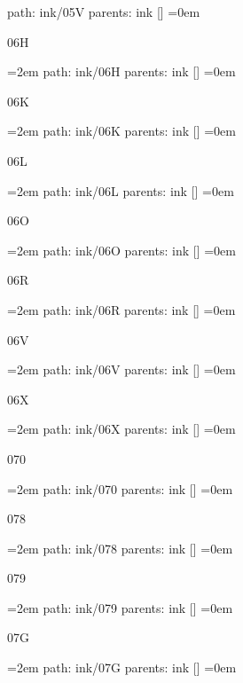 path: ink/05V
\smallskip
parents:  ink []
\smallskip
\leftskip=0em
\par\endgroup
\bigskip
{}
06H
\smallskip
\par\begingroup
\leftskip=2em
path: ink/06H
\smallskip
parents:  ink []
\smallskip
\leftskip=0em
\par\endgroup
\bigskip
{}
06K
\smallskip
\par\begingroup
\leftskip=2em
path: ink/06K
\smallskip
parents:  ink []
\smallskip
\leftskip=0em
\par\endgroup
\bigskip
{}
06L
\smallskip
\par\begingroup
\leftskip=2em
path: ink/06L
\smallskip
parents:  ink []
\smallskip
\leftskip=0em
\par\endgroup
\bigskip
{}
06O
\smallskip
\par\begingroup
\leftskip=2em
path: ink/06O
\smallskip
parents:  ink []
\smallskip
\leftskip=0em
\par\endgroup
\bigskip
{}
06R
\smallskip
\par\begingroup
\leftskip=2em
path: ink/06R
\smallskip
parents:  ink []
\smallskip
\leftskip=0em
\par\endgroup
\bigskip
{}
06V
\smallskip
\par\begingroup
\leftskip=2em
path: ink/06V
\smallskip
parents:  ink []
\smallskip
\leftskip=0em
\par\endgroup
\bigskip
{}
06X
\smallskip
\par\begingroup
\leftskip=2em
path: ink/06X
\smallskip
parents:  ink []
\smallskip
\leftskip=0em
\par\endgroup
\bigskip
{}
070
\smallskip
\par\begingroup
\leftskip=2em
path: ink/070
\smallskip
parents:  ink []
\smallskip
\leftskip=0em
\par\endgroup
\bigskip
{}
078
\smallskip
\par\begingroup
\leftskip=2em
path: ink/078
\smallskip
parents:  ink []
\smallskip
\leftskip=0em
\par\endgroup
\bigskip
{}
079
\smallskip
\par\begingroup
\leftskip=2em
path: ink/079
\smallskip
parents:  ink []
\smallskip
\leftskip=0em
\par\endgroup
\bigskip
{}
07G
\smallskip
\par\begingroup
\leftskip=2em
path: ink/07G
\smallskip
parents:  ink []
\smallskip
\leftskip=0em
\par\endgroup
\bigskip
\bye
